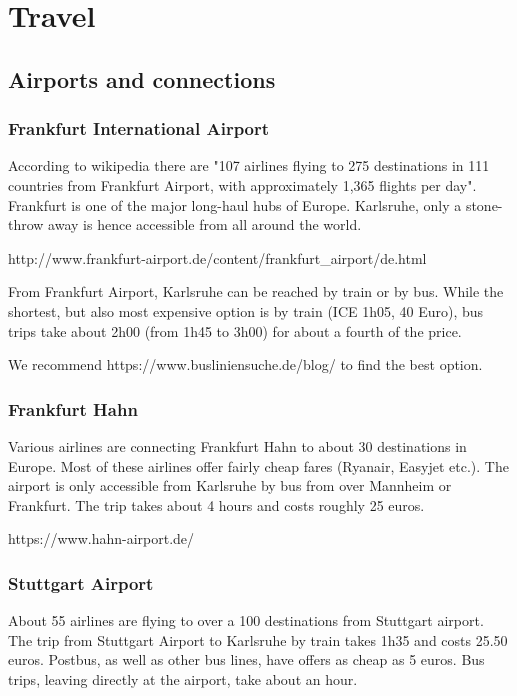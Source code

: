 \section{Travel}

\subsection{Airports and connections}

\subsubsection{Frankfurt International Airport}

According to wikipedia there are "107 airlines flying to 275 destinations in 111 countries from Frankfurt Airport, with approximately 1,365 flights per day". Frankfurt is one of the major long-haul hubs of Europe. Karlsruhe, only a stone-throw away is hence accessible from all around the world.

http://www.frankfurt-airport.de/content/frankfurt_airport/de.html

From Frankfurt Airport, Karlsruhe can be reached by train or by bus. While the shortest, but also most expensive option is by train (ICE 1h05, 40 Euro), bus trips take about 2h00 (from 1h45 to 3h00) for about a fourth of the price.

We recommend https://www.busliniensuche.de/blog/ to find the best option.

\subsubsection{Frankfurt Hahn}

Various airlines are connecting Frankfurt Hahn to about 30 destinations in Europe. Most of these airlines offer fairly cheap fares (Ryanair, Easyjet etc.). The airport is only accessible from Karlsruhe by bus from over Mannheim or Frankfurt. The trip takes about 4 hours and costs roughly 25 euros.

https://www.hahn-airport.de/

\subsubsection{Stuttgart Airport}

About 55 airlines are flying to over a 100 destinations from Stuttgart airport. The trip from Stuttgart Airport to Karlsruhe by train takes 1h35 and costs 25.50 euros. Postbus, as well as other bus lines, have offers as cheap as 5 euros. Bus trips, leaving directly at the airport, take about an hour. 

